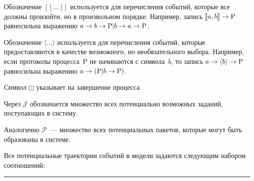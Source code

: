 \begin{multicols}{2}
    Обозначение $[\![\ldots]\!]$ используется для перечисления событий, 
которые все должны произойти, но в произвольном порядке. Например, 
запись $[\![a,b]\!]\hm\rightarrow \mathrm{P}$ равносильна выражению 
$a\hm\rightarrow b\hm\rightarrow \mathrm{P}\vert b \hm\rightarrow 
a\rightarrow \mathrm{P}$.
    
    Обозначение $\langle\ldots\rangle$ используется для перечисления 
событий, которые предоставляются в качестве возможного, но 
необязательного выбора. Например, если протоколы процесса~P не 
начинаются с символа~$b$, то запись $a\hm\rightarrow \langle b\rangle 
\hm\rightarrow \mathrm{P}$ равносильна выражению $a\hm\rightarrow 
\left( \mathrm{P}\vert b\hm\rightarrow \mathrm{P}\right)$.
    
    Символ $\boxdot$ указывает на завершение процесса.
    
    Через $\mathcal{J}$ обозначается множество всех потенциально возможных 
заданий, поступающих в систему. 

Аналогично $\mathcal{P}$~--- множество всех 
потенциальных пакетов, которые могут быть образованы в сис\-теме.
    
    Все потенциальные траектории событий в модели задаются следующим 
набором соотношений:

\end{multicols}

\hrule


